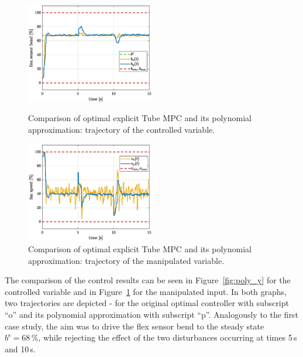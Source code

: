 \documentclass[letterpaper, 10 pt, conference]{ieeeconf}
\begin{document}
	\begin{figure}[bp!]
		\begin{center}
			\includegraphics[width=0.5\textwidth]{images/poly_b.eps}
			\caption{Comparison of optimal explicit Tube MPC and its polynomial approximation: trajectory of the controlled variable.}
			\label{fig:poly_y}
		\end{center}
		\begin{center}
			\includegraphics[width=0.5\textwidth]{images/poly_v.eps}
			\caption{Comparison of optimal explicit Tube MPC and its polynomial approximation: trajectory of the manipulated variable.}
			\label{fig:poly_u}
		\end{center}
	\end{figure}
	
	
	The comparison of the control results can be seen in Figure~\ref{fig:poly_y} for the controlled variable and in Figure~\ref{fig:poly_u} for the manipulated input. In both graphs, two trajectories are depicted - for the original optimal controller with subscript ``o'' and its polynomial approximation with subscript ``p''. Analogously to the first case study, the aim was to drive the flex sensor bend to the steady state $ b^\mathrm{s} = 68\,\%$, while rejecting the effect of the two disturbances occurring at times 5\,s and 10\,s.
	
\end{document}
